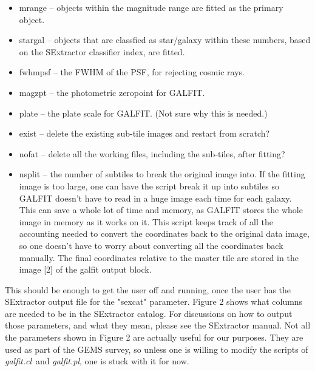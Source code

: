 \documentclass[preprint]{aastex}
\def\galfitcl{{\it galfit.cl}}
\def\galfitpl{{\it galfit.pl}}
\begin{document}
\begin {itemize}
\item mrange -- objects within the magnitude range are fitted as the primary
object.

\item stargal -- objects that are classfied as star/galaxy within these
numbers, based on the SExtractor classifier index, are fitted.

\item fwhmpsf -- the FWHM of the PSF, for rejecting cosmic rays.

\item magzpt -- the photometric zeropoint for GALFIT.

\item plate -- the plate scale for GALFIT.  (Not sure why this is needed.)

\item exist -- delete the existing sub-tile images and restart from scratch?

\item nofat -- delete all the working files, including the sub-tiles, after
fitting?

\item nsplit -- the number of subtiles to break the original image into.  If
the fitting image is too large, one can have the script break it up into
subtiles so GALFIT doesn't have to read in a huge image each time for each
galaxy.  This can save a whole lot of time and memory, as GALFIT stores the
whole image in memory as it works on it.  This script keeps track of all the
accounting needed to convert the coordinates back to the original data image,
so one doesn't have to worry about converting all the coordinates back
manually.  The final coordinates relative to the master tile are stored in
the image [2] of the galfit output block.

\end {itemize}

This should be enough to get the user off and running, once the user has the
SExtractor output file for the "sexcat" parameter.  Figure 2 shows what
columns are needed to be in the SExtractor catalog.  For discussions on how to
output those parameters, and what they mean, please see the SExtractor manual.
Not all the parameters shown in Figure 2 are actually useful for our purposes.
They are used as part of the GEMS survey, so unless one is willing to modify
the scripts of \galfitcl\ and \galfitpl, one is stuck with it for now.

\newpage
\footnotesize
\end{document}
